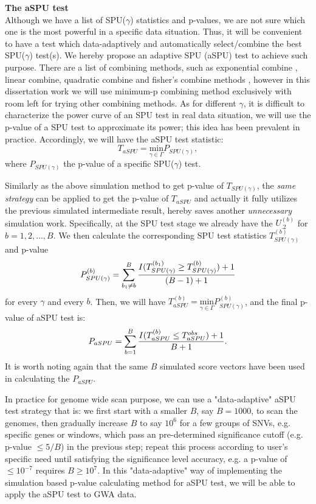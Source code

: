 \documentclass[12pt]{article}
\begin{document}
\textbf{The aSPU test}\\
Although we have a list of SPU($\gamma$) statistics and p-values, we are not sure which one is the most powerful in a specific data situation. Thus, it will be convenient to have a test which data-adaptively and automatically select/combine the best SPU($\gamma$) test(s). We hereby propose an adaptive SPU (aSPU) test to achieve such purpose. There are a list of combining methods, such as exponential combine \cite{Chen2012}, linear combine, quadratic combine and fisher's combine methods \cite{Luo2010,peng2009gene,Derkach2013}, however in this dissertation work we will use minimum-p combining method exclusively with room left for trying other combining methods. As for different $\gamma$, it is difficult to characterize the power curve of an SPU test in real data situation, we will use the p-value of a SPU test to approximate its power; this idea has been prevalent in practice. Accordingly, we will have the aSPU test statistic:
$$
T_{aSPU} = \underset{\gamma\in\Gamma}{ \textrm{min} } P_{ SPU(\gamma) },
$$
where $P_{ SPU(\gamma) }$ the p-value of a specific SPU($\gamma$) test.

Similarly as the above simulation method to get p-value of $T_{ SPU(\gamma) }$, the \textit{same strategy} can be applied to get the p-value of $T_{aSPU}$ and actually it fully utilizes the previous simulated intermediate result, hereby saves another \textit{unnecessary} simulation work. Specifically, at the SPU test stage we already have the $U_{.2}^{ (b) }$ for $b = 1,2,\ldots,B$. We then calculate the corresponding SPU test statistics $T^{ (b) }_{ SPU(\gamma) }$ and p-value 
$$
P^{ (b) }_{ SPU(\gamma) } =  \sum_{b_1 \neq b}^B { I(T^{ (b_1) }_{ SPU(\gamma) } \geq T^{ (b) }_{ SPU(\gamma) } ) + 1  \over (B-1) + 1 } 
$$
for every $\gamma$ and every $b$. Then, we will have $ 
T ^ {(b)} _{aSPU} = \underset{\gamma\in\Gamma}{ \textrm{min} } P^{ (b) }_{ SPU(\gamma) }
$, and the final p-value of aSPU test is:
$$
P_{aSPU} = \sum_{b=1}^B { I(T ^ {(b)} _{aSPU} \leq T ^ {obs} _{aSPU} ) + 1  \over B + 1 }.
$$
It is worth noting again that the same $B$ simulated score vectors have been used in calculating the $P_{aSPU}$. 

In practice for genome wide scan purpose, we can use a "data-adaptive" aSPU test strategy that is: we first start with a smaller $B$, say $B = 1000$, to scan the genomes, then gradually increase $B$ to say $10^6$ for a few groups of SNVs, e.g. specific genes or windows, which pass an pre-determined significance cutoff (e.g. p-value $ \leq 5/B$) in the previous step; repeat this process according to user's specific need until satisfying the significance level accuracy, e.g. a p-value of $\leq 10 ^ {-7}$ requires $B \geq 10^7$. In this "data-adaptive" way of implementing the simulation based p-value calculating method for aSPU test, we will be able to apply the aSPU test to GWA data. 
\end{document}
